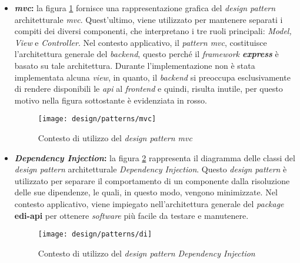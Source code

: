 \begin{itemize}
  \item \textbf{\emph{\acrlong{mvc}}:} 
  la figura \ref{fig:mvc-pattern} fornisce una rappresentazione grafica del \emph{design pattern} architetturale \emph{\acrshort{mvc}}. Quest'ultimo, viene utilizzato per mantenere separati i compiti dei diversi componenti,
  che interpretano i tre ruoli principali: \emph{Model, View} e \emph{Controller}. Nel contesto applicativo, il \emph{pattern \acrshort{mvc}}, costituisce l'architettura generale del \emph{\gls{backend}}, questo perché il
  \emph{framework \textbf{express}} è basato su tale architettura. Durante l'implementazione non è stata implementata alcuna \emph{view}, in quanto, il \emph{\gls{backend}} si preoccupa esclusivamente di rendere disponibili 
  le \emph{\acrshort{api}} al \emph{\gls{frontend}} e quindi, risulta inutile, per questo motivo nella figura sottostante è evidenziata in rosso.

  \begin{figure}[!ht]
    \begin{center}
      \texttt{[image: design/patterns/mvc]}
      \caption{Contesto di utilizzo del \emph{design pattern \acrshort{mvc}}}
      \label{fig:mvc-pattern}
    \end{center}
  \end{figure}
  \item \textbf{\emph{Dependency Injection}:}
  la figura \ref{fig:di-pattern} rappresenta il diagramma delle classi del \emph{design pattern} architetturale \emph{Dependency Injection}. Questo \emph{design pattern} è utilizzato per separare il comportamento di un componente dalla 
  risoluzione delle sue dipendenze, le quali, in questo modo, vengono minimizzate. Nel contesto applicativo, viene impiegato nell'architettura generale del
  \emph{package} \textbf{edi-api} per ottenere \emph{software} più facile da testare e manutenere. 

  \begin{figure}[!ht]
    \begin{center}
      \texttt{[image: design/patterns/di]}
      \caption{Contesto di utilizzo del \emph{design pattern Dependency Injection}}
      \label{fig:di-pattern}
    \end{center}
  \end{figure}
\end{itemize}

\newpage
